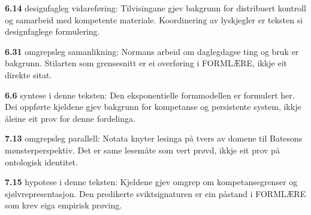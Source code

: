\begin{widebody}
\noindent\hypertarget{kjeldenotat-6.14}{}\textbf{6.14} designfagleg vidareføring: Tilvisingane gjev bakgrunn for distribuert kontroll og samarbeid med kompetente materiale. Koordinering av lyskjegler er teksten si designfaglege formulering.\par\medskip
\noindent\hypertarget{kjeldenotat-6.31}{}\textbf{6.31} omgrepsleg samanlikning: Normans arbeid om daglegdagse ting og bruk er bakgrunn. Stilarten som grensesnitt er ei overføring i FORMLÆRE, ikkje eit direkte sitat.\par\medskip
\noindent\hypertarget{kjeldenotat-6.6}{}\textbf{6.6} syntese i denne teksten: Den eksponentielle formmodellen er formulert her. Dei oppførte kjeldene gjev bakgrunn for kompetanse og persistente system, ikkje åleine eit prov for denne fordelinga.\par\medskip
\noindent\hypertarget{kjeldenotat-7.13}{}\textbf{7.13} omgrepsleg parallell: Notata knyter lesinga på tvers av domene til Batesons mønsterperspektiv. Det er same lesemåte som vert prøvd, ikkje eit prov på ontologisk identitet.\par\medskip
\noindent\hypertarget{kjeldenotat-7.15}{}\textbf{7.15} hypotese i denne teksten: Kjeldene gjev omgrep om kompetansegrenser og sjølvrepresentasjon. Den predikerte sviktsignaturen er ein påstand i FORMLÆRE som krev eiga empirisk prøving.\par\medskip
\end{widebody}
